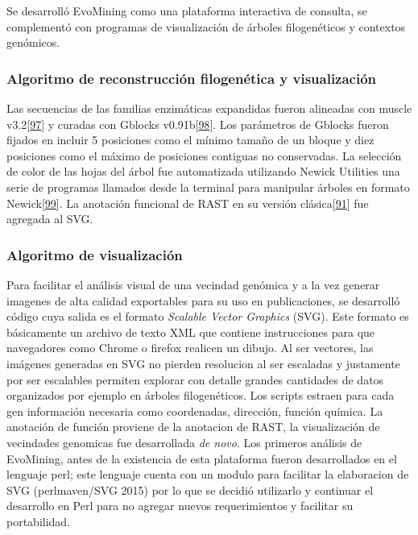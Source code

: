 \documentclass[12pt,twoside]{reedthesis}
\begin{document}
  Se desarrolló EvoMining como una plataforma interactiva de consulta, se
  complementó con programas de visualización de árboles filogenéticos y
  contextos genómicos.
  
  \subsubsection{Algoritmo de reconstrucción filogenética y
  visualización}\label{algoritmo-de-reconstruccion-filogenetica-y-visualizacion}
  
  Las secuencias de las familias enzimáticas expandidas fueron alineadas
  con muscle v3.2{[}\protect\hyperlink{ref-edgar_muscle_2004}{97}{]} y
  curadas con Gblocks
  v0.91b{[}\protect\hyperlink{ref-castresana_selection_2000}{98}{]}. Los
  parámetros de Gblocks fueron fijados en incluir 5 posiciones como el
  mínimo tamaño de un bloque y diez posiciones como el máximo de
  posiciones contiguas no conservadas. La selección de color de las hojas
  del árbol fue automatizada utilizando Newick Utilities una serie de
  programas llamados desde la terminal para manipular árboles en formato
  Newick{[}\protect\hyperlink{ref-junier_newick_2010}{99}{]}. La anotación
  funcional de RAST en su versión
  clásica{[}\protect\hyperlink{ref-aziz_rast_2008}{91}{]} fue agregada al
  SVG.
  
  \subsubsection{Algoritmo de
  visualización}\label{algoritmo-de-visualizacion}
  
  Para facilitar el análisis visual de una vecindad genómica y a la vez
  generar imagenes de alta calidad exportables para su uso en
  publicaciones, se desarrolló código cuya salida es el formato
  \emph{Scalable Vector Graphics} (SVG). Este formato es básicamente un
  archivo de texto XML que contiene instrucciones para que navegadores
  como Chrome o firefox realicen un dibujo. Al ser vectores, las imágenes
  generadas en SVG no pierden resolucion al ser escaladas y justamente por
  ser escalables permiten explorar con detalle grandes cantidades de datos
  organizados por ejemplo en árboles filogenéticos. Los scripts estraen
  para cada gen información necesaria como coordenadas, dirección, función
  química. La anotación de función proviene de la anotacion de RAST, la
  visualización de vecindades genomicas fue desarrollada \emph{de novo}.
  Los primeros análisis de EvoMining, antes de la existencia de esta
  plataforma fueron desarrollados en el lenguaje perl; este lenguaje
  cuenta con un modulo para facilitar la elaboracion de SVG (perlmaven/SVG
  2015) por lo que se decidió utilizarlo y continuar el desarrollo en Perl
  para no agregar nuevos requerimientos y facilitar su portabilidad.
  
\end{document}
